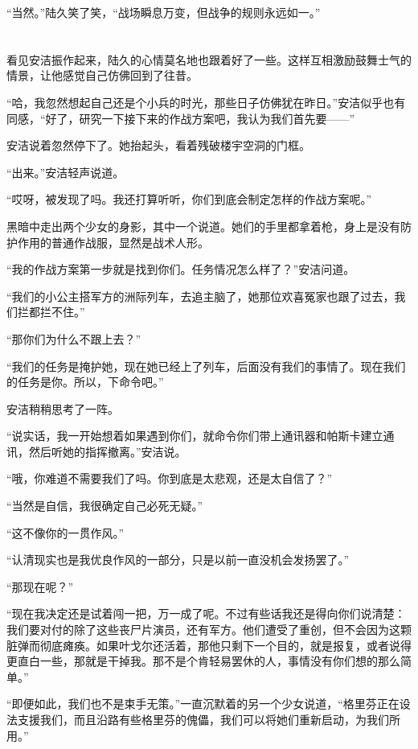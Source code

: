“当然。”陆久笑了笑，“战场瞬息万变，但战争的规则永远如一。”

\section*{}

看见安洁振作起来，陆久的心情莫名地也跟着好了一些。这样互相激励鼓舞士气的情景，让他感觉自己仿佛回到了往昔。

“哈，我忽然想起自己还是个小兵的时光，那些日子仿佛犹在昨日。”安洁似乎也有同感，“好了，研究一下接下来的作战方案吧，我认为我们首先要——”

安洁说着忽然停下了。她抬起头，看着残破楼宇空洞的门框。

“出来。”安洁轻声说道。

“哎呀，被发现了吗。我还打算听听，你们到底会制定怎样的作战方案呢。”

黑暗中走出两个少女的身影，其中一个说道。她们的手里都拿着枪，身上是没有防护作用的普通作战服，显然是战术人形。

“我的作战方案第一步就是找到你们。任务情况怎么样了？”安洁问道。

“我们的小公主搭军方的洲际列车，去追主脑了，她那位欢喜冤家也跟了过去，我们拦都拦不住。”

“那你们为什么不跟上去？”

“我们的任务是掩护她，现在她已经上了列车，后面没有我们的事情了。现在我们的任务是你。所以，下命令吧。”

安洁稍稍思考了一阵。

“说实话，我一开始想着如果遇到你们，就命令你们带上通讯器和帕斯卡建立通讯，然后听她的指挥撤离。”安洁说。

“哦，你难道不需要我们了吗。你到底是太悲观，还是太自信了？”

“当然是自信，我很确定自己必死无疑。”

“这不像你的一贯作风。”

“认清现实也是我优良作风的一部分，只是以前一直没机会发扬罢了。”

“那现在呢？”

“现在我决定还是试着闯一把，万一成了呢。不过有些话我还是得向你们说清楚：我们要对付的除了这些丧尸片演员，还有军方。他们遭受了重创，但不会因为这颗脏弹而彻底瘫痪。如果叶戈尔还活着，那他只剩下一个目的，就是报复，或者说得更直白一些，那就是干掉我。那不是个肯轻易罢休的人，事情没有你们想的那么简单。”

“即便如此，我们也不是束手无策。”一直沉默着的另一个少女说道，“格里芬正在设法支援我们，而且沿路有些格里芬的傀儡，我们可以将她们重新启动，为我们所用。”


